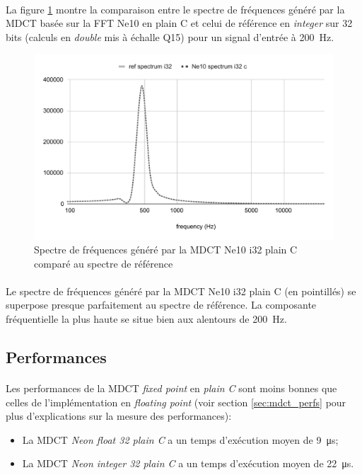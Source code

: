 \documentclass{article}
\begin{document}
    \paragraph{}
    La figure \ref{fig:validation_ne10_i32_c} montre la comparaison entre le spectre de fréquences généré par la MDCT basée sur la FFT Ne10 en plain C et celui de référence en \emph{integer} sur 32 bits (calculs en \emph{double} mis à échalle Q15) pour un signal d'entrée à \SI{200}{\hertz}.

    \begin{figure}[H]
        \centering
        \includegraphics[width=.8\linewidth]{./images/validation_ne10_i32_c.pdf}
        \caption{Spectre de fréquences généré par la MDCT Ne10 i32 plain C comparé au spectre de référence}
        \label{fig:validation_ne10_i32_c}
    \end{figure}

    \paragraph{}
    Le spectre de fréquences généré par la MDCT Ne10 i32 plain C (en pointillés) se superpose presque parfaitement au spectre de référence. La composante fréquentielle la plus haute se situe bien aux alentours de \SI{200}{\hertz}.



    \subsection{Performances}
    \label{sec:fixed_point_perfs}
    \paragraph{}
    Les performances de la MDCT \emph{fixed point} en \emph{plain C} sont moins bonnes que celles de l'implémentation en \emph{floating point} (voir section \ref{sec:mdct_perfs} pour plus d'explications sur la mesure des performances):
    \begin{itemize}
        \item La MDCT \emph{Neon float 32 plain C} a un temps d'exécution moyen de \SI{9}{\micro\second};
        \item La MDCT \emph{Neon integer 32 plain C} a un temps d'exécution moyen de \SI{22}{\micro\second}.
    \end{itemize}
\end{document}
